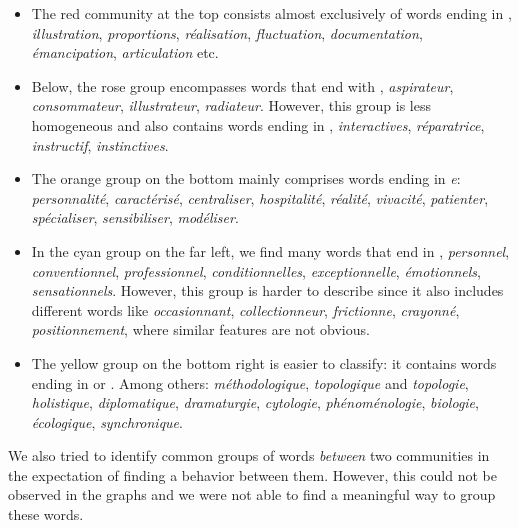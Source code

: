 \begin{itemize}
    \item The red community at the top consists almost exclusively of words ending in , \eg \textit{illustration}, \textit{proportions}, \textit{réalisation}, \textit{fluctuation}, \textit{documentation}, \textit{émancipation}, \textit{articulation} etc.
    
    \item Below, the rose group encompasses words that end with , \eg \textit{aspirateur}, \textit{consommateur}, \textit{illustrateur}, \textit{radiateur}. However, this group is less homogeneous and also contains words ending in , \eg \textit{interactives}, \textit{réparatrice}, \textit{instructif}, \textit{instinctives}. 
    
    \item The orange group on the bottom mainly comprises words ending in \textit{e}: \textit{personnalité}, \textit{caractérisé}, \textit{centraliser}, \textit{hospitalité}, \textit{réalité}, \textit{vivacité}, \textit{patienter}, \textit{spécialiser}, \textit{sensibiliser}, \textit{modéliser}.
    
    \item In the cyan group on the far left, we find many words that end in , \eg \textit{personnel}, \textit{conventionnel}, \textit{professionnel}, \textit{conditionnelles}, \textit{exceptionnelle}, \textit{émotionnels}, \textit{sensationnels}. However, this group is harder to describe since it also includes different words like \textit{occasionnant}, \textit{collectionneur}, \textit{frictionne}, \textit{crayonné}, \textit{positionnement}, where similar features are not obvious.
    
    \item The yellow group on the bottom right is easier to classify: it contains words ending in  or . Among others: \textit{méthodologique}, \textit{topologique} and \textit{topologie}, \textit{holistique}, \textit{diplomatique}, \textit{dramaturgie}, \textit{cytologie}, \textit{phénoménologie}, \textit{biologie}, \textit{écologique}, \textit{synchronique}. 
\end{itemize}

We also tried to identify common groups of words \textit{between} two communities in the expectation of finding a  behavior between them. However, this could not be observed in the graphs and we were not able to find a meaningful way to group these words.

